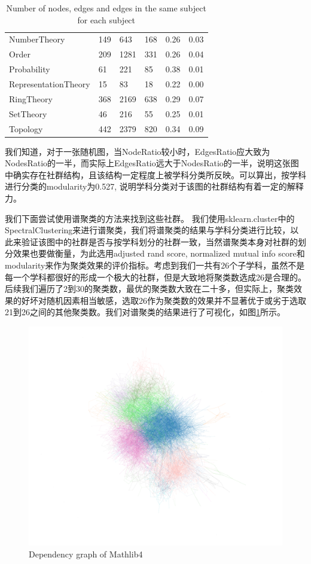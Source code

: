 \begin{table}[H]
\begin{tabular}{llllll}
    NumberTheory & 149 & 643 & 168 & 0.26 & 0.03\\
    Order & 209 & 1281 & 331 & 0.26 & 0.04\\
    Probability & 61 & 221 & 85 & 0.38 & 0.01\\
    RepresentationTheory & 15 & 83 & 18 & 0.22 & 0.00\\
    RingTheory & 368 & 2169 & 638 & 0.29 & 0.07\\
    SetTheory & 46 & 216 & 55 & 0.25 & 0.01\\
    Topology& 442 & 2379 & 820 & 0.34 & 0.09\\
    \bottomrule
\end{tabular}
\caption{Number of nodes, edges and edges in the same subject for each subject}
\label{tab:Ratio}
\end{table}

我们知道，对于一张随机图，当NodeRatio较小时，EdgesRatio应大致为NodesRatio的一半，而实际上EdgesRatio远大于NodesRatio的一半，说明这张图中确实存在社群结构，且该结构一定程度上被学科分类所反映。可以算出，按学科进行分类的modularity为0.527, 说明学科分类对于该图的社群结构有着一定的解释力。

我们下面尝试使用谱聚类的方法来找到这些社群。
我们使用sklearn.cluster中的SpectralClustering来进行谱聚类，我们将谱聚类的结果与学科分类进行比较，以此来验证该图中的社群是否与按学科划分的社群一致，当然谱聚类本身对社群的划分效果也要做衡量，为此选用adjusted rand score, normalized mutual info score和modularity来作为聚类效果的评价指标。考虑到我们一共有26个子学科，虽然不是每一个学科都很好的形成一个极大的社群，但是大致地将聚类数选成26是合理的。后续我们遍历了2到30的聚类数，最优的聚类数大致在二十多，但实际上，聚类效果的好坏对随机因素相当敏感，选取26作为聚类数的效果并不显著优于或劣于选取21到26之间的其他聚类数。我们对谱聚类的结果进行了可视化，如图\ref{fig:clustering}所示。

\begin{figure}[H]
    \centering
    \includegraphics[width=1.0\textwidth]{../img/graph_spectral_cluster.pdf}
    \caption{Dependency graph of Mathlib4}
    \label{fig:clustering}
\end{figure}

